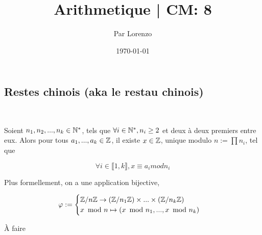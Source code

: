 \documentclass[a4paper, 12pt]{article}
\title{Arithmetique | CM: 8}
\author{Par Lorenzo}
\date{\today}
\begin{document}
\maketitle

\subsection{Restes chinois (aka le restau chinois)}

\begin{theorem}\

    Soient $n_1, n_2, ..., n_k \in \mathbb{N}^*$, tels que $\forall i \in \mathbb{N}^*, n_i \geq 2$ et deux à deux premiers entre eux.
    Alors pour tous $a_1, ..., a_k \in \mathbb{Z}$, il existe $x \in \mathbb{Z}$, unique modulo
    $n := \prod n_i$, tel que

    $$
        \forall i \in \llbracket1, k\rrbracket, x \equiv a_i mod n_i
    $$
    
    \vspace{2cm}

    Plus formellement, on a une application bijective,

    $$
    \varphi :=
    \begin{cases}
        \mathbb{Z}/n\mathbb{Z} \to (\mathbb{Z}/n_1\mathbb{Z}) \times ... \times (\mathbb{Z}/n_k\mathbb{Z}) \\
        x\!\mod n \mapsto (x\!\mod n_1, ..., x\!\mod n_k)
    \end{cases}
    $$
\end{theorem}

\begin{demonstration}
    À faire
\end{demonstration}







\end{document}
